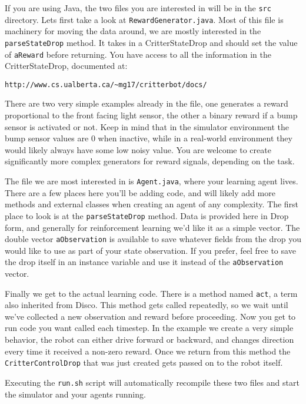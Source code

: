 \documentclass[12pt]{article}
\begin{document}
If you are using Java, the two files you are interested in will be in the \verb+src+ directory.  Lets first take a look at \verb+RewardGenerator.java+.  Most of this file is machinery for moving the data around, we are mostly interested in the \verb+parseStateDrop+ method.  It takes in a CritterStateDrop and should set the value of \verb+aReward+ before returning.  You have access to all the information in the CritterStateDrop, documented at:

\begin{verbatim}
http://www.cs.ualberta.ca/~mg17/critterbot/docs/
\end{verbatim}

There are two very simple examples already in the file, one generates a reward proportional to the front facing light sensor, the other a binary reward if a bump sensor is activated or not.  Keep in mind that in the simulator environment the bump sensor values are 0 when inactive, while in a real-world environment they would likely always have some low noisy value.  You are welcome to create significantly more complex generators for reward signals, depending on the task.

The file we are most interested in is \verb+Agent.java+, where your learning agent lives.  There are a few places here you'll be adding code, and will likely add more methods and external classes when creating an agent of any complexity.  The first place to look is at the \verb+parseStateDrop+ method.  Data is provided here in Drop form, and generally for reinforcement learning we'd like it as a simple vector.  The double vector \verb+aObservation+ is available to save whatever fields from the drop you would like to use as part of your state observation.  If you prefer, feel free to save the drop itself in an instance variable and use it instead of the \verb+aObservation+ vector.

Finally we get to the actual learning code.  There is a method named \verb+act+, a term also inherited from Disco.  This method gets called repeatedly, so we wait until we've collected a new observation and reward before proceeding.  Now you get to run code you want called each timestep.  In the example we create a very simple behavior, the robot can either drive forward or backward, and changes direction every time it received a non-zero reward.  Once we return from this method the \verb+CritterControlDrop+ that was just created gets passed on to the robot itself.

Executing the \verb+run.sh+ script will automatically recompile these two files and start the simulator and your agents running.
\end{document}
